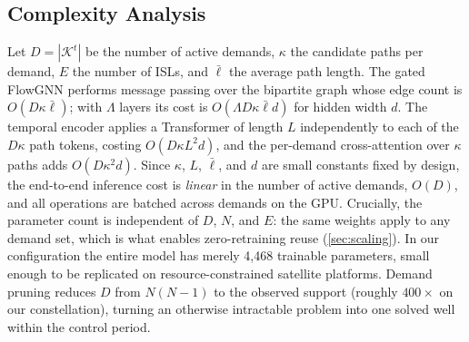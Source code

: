 \subsection{Complexity Analysis}
\label{sec:complexity}

Let $D = |\mathcal{K}^t|$ be the number of active demands, $\kappa$ the
candidate paths per demand, $E$ the number of ISLs, and $\bar{\ell}$ the
average path length. The gated FlowGNN performs message passing over the
bipartite graph whose edge count is $O(D\kappa\bar{\ell})$; with $\Lambda$
layers its cost is $O(\Lambda D \kappa \bar{\ell} d)$ for hidden width $d$.
The temporal encoder applies a Transformer of length $L$ independently to
each of the $D\kappa$ path tokens, costing $O(D\kappa L^2 d)$, and the
per-demand cross-attention over $\kappa$ paths adds $O(D\kappa^2 d)$. Since
$\kappa$, $L$, $\bar{\ell}$, and $d$ are small constants fixed by design, the
end-to-end inference cost is \emph{linear} in the number of active demands,
$O(D)$, and all operations are batched across demands on the GPU.
Crucially, the parameter count is independent of $D$, $N$, and $E$: the same
weights apply to any demand set, which is what enables zero-retraining reuse
(\cref{sec:scaling}). In our configuration the entire model has merely
4{,}468 trainable parameters, small enough to be replicated on
resource-constrained satellite platforms. Demand pruning reduces $D$ from
$N(N-1)$ to the observed support (roughly $400\times$ on our
constellation), turning an otherwise intractable problem into one
solved well within the control period.
